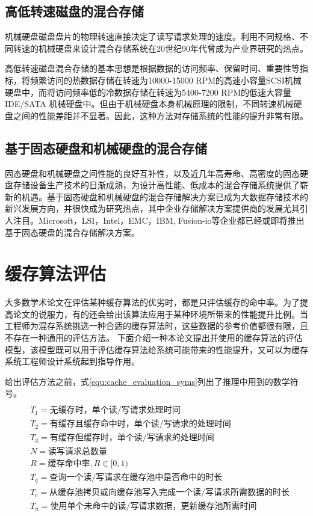 \subsection{高低转速磁盘的混合存储}

机械硬盘磁盘盘片的物理转速直接决定了读写请求处理的速度。利用不同规格、不同转速的机械硬盘来设计混合存储系统在20世纪90年代曾成为产业界研究的热点。

高低转速磁盘混合存储的基本思想是根据数据的访问频率、保留时间、重要性等指标，将频繁访问的热数据存储在转速为10000-15000 RPM的高速小容量SCSI机械硬盘中，而将访问频率低的冷数据存储在转速为5400-7200 RPM的低速大容量IDE/SATA 机械硬盘中。但由于机械硬盘本身机械原理的限制，不同转速机械硬盘之间的性能差距并不显著。因此，这种方法对存储系统的性能的提升非常有限。

\subsection{基于固态硬盘和机械硬盘的混合存储}

固态硬盘和机械硬盘之间性能的良好互补性，以及近几年高寿命、高密度的固态硬盘存储设备生产技术的日渐成熟，为设计高性能、低成本的混合存储系统提供了崭新的机遇。基于固态硬盘和机械硬盘的混合存储解决方案已成为大数据存储技术的新兴发展方向，并很快成为研究热点，其中企业存储解决方案提供商的发展尤其引人注目。Microsoft，LSI，Intel，EMC，IBM, Fusion-io等企业都已经或即将推出基于固态硬盘的混合存储解决方案。

\section{缓存算法评估}
\label{sec:cache_evaluation}

大多数学术论文在评估某种缓存算法的优劣时，都是只评估缓存的命中率。为了提高论文的说服力，有的还会给出该算法应用于某种环境所带来的性能提升比例。当工程师为混存系统挑选一种合适的缓存算法时，这些数据的参考价值都很有限，且不存在一种通用的评估方法。
下面介绍一种本论文提出并使用的缓存算法的评估模型，该模型既可以用于评估缓存算法给系统可能带来的性能提升，又可以为缓存系统工程师设计系统起到指导作用。

给出评估方法之前，式\ref{equ:cache_evaluation_syms}列出了推理中用到的数学符号。
\begin{equation}
\begin{split}
\\&T_1=\mbox{无缓存时，单个读/写请求处理时间}
\\&T_2=\mbox{有缓存且缓存命中时，单个读/写请求的处理时间}
\\&T_3=\mbox{有缓存但缓存时，单个读/写请求的处理时间}
\\&N=\mbox{读写请求总数量}
\\&R=\mbox{缓存命中率},R\in\lbrack0,1)
\\&T_q=\mbox{查询一个读/写请求在缓存池中是否命中的时长}
\\&T_c=\mbox{从缓存池拷贝或向缓存池写入完成一个读/写请求所需数据的时长}
\\&T_u=\mbox{使用单个未命中的读/写请求数据，更新缓存池所需时间}
\end{split}
\label{equ:cache_evaluation_syms}
\end{equation}

